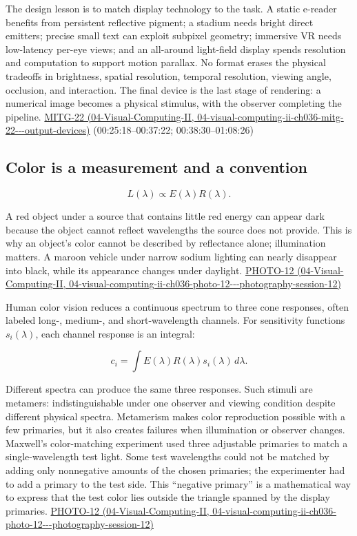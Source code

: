 The design lesson is to match display technology to the task. A static e-reader benefits from persistent reflective pigment; a stadium needs bright direct emitters; precise small text can exploit subpixel geometry; immersive VR needs low-latency per-eye views; and an all-around light-field display spends resolution and computation to support motion parallax. No format erases the physical tradeoffs in brightness, spatial resolution, temporal resolution, viewing angle, occlusion, and interaction. The final device is the last stage of rendering: a numerical image becomes a physical stimulus, with the observer completing the pipeline. \href{../04-Visual-Computing-II/main.pdf\#nameddest=04-visual-computing-ii-ch036-mitg-22---output-devices}{MITG-22 (04-Visual-Computing-II, 04-visual-computing-ii-ch036-mitg-22-\/-\/-output-devices)} (00:25:18--00:37:22; 00:38:30--01:08:26)

\subsection{Color is a measurement and a convention}\label{03-visual-computing-i-ch004-color-is-a-measurement-and-a-convention}

\[
L(\lambda)\propto E(\lambda)R(\lambda).
\]

A red object under a source that contains little red energy can appear dark because the object cannot reflect wavelengths the source does not provide. This is why an object's color cannot be described by reflectance alone; illumination matters. A maroon vehicle under narrow sodium lighting can nearly disappear into black, while its appearance changes under daylight. \href{../04-Visual-Computing-II/main.pdf\#nameddest=04-visual-computing-ii-ch036-photo-12---photography-session-12}{PHOTO-12 (04-Visual-Computing-II, 04-visual-computing-ii-ch036-photo-12-\/-\/-photography-session-12)}

Human color vision reduces a continuous spectrum to three cone responses, often labeled long-, medium-, and short-wavelength channels. For sensitivity functions \(s_i(\lambda)\), each channel response is an integral:

\[
c_i=\int E(\lambda)R(\lambda)s_i(\lambda)\,d\lambda.
\]

Different spectra can produce the same three responses. Such stimuli are metamers: indistinguishable under one observer and viewing condition despite different physical spectra. Metamerism makes color reproduction possible with a few primaries, but it also creates failures when illumination or observer changes. Maxwell's color-matching experiment used three adjustable primaries to match a single-wavelength test light. Some test wavelengths could not be matched by adding only nonnegative amounts of the chosen primaries; the experimenter had to add a primary to the test side. This ``negative primary'' is a mathematical way to express that the test color lies outside the triangle spanned by the display primaries. \href{../04-Visual-Computing-II/main.pdf\#nameddest=04-visual-computing-ii-ch036-photo-12---photography-session-12}{PHOTO-12 (04-Visual-Computing-II, 04-visual-computing-ii-ch036-photo-12-\/-\/-photography-session-12)}

